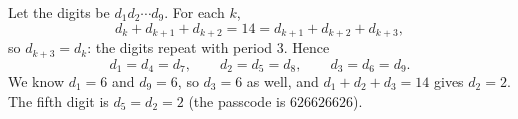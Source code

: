 Let the digits be $d_1d_2\cdots d_9$. For each $k$,
\[
d_k+d_{k+1}+d_{k+2}=14=d_{k+1}+d_{k+2}+d_{k+3},
\]
so $d_{k+3}=d_k$: the digits repeat with period $3$. Hence
\[
d_1=d_4=d_7,\qquad d_2=d_5=d_8,\qquad d_3=d_6=d_9 .
\]
We know $d_1=6$ and $d_9=6$, so $d_3=6$ as well, and $d_1+d_2+d_3=14$ gives $d_2=2$. The fifth digit is $d_5=d_2=\boxed{2}$ (the passcode is $626626626$).
